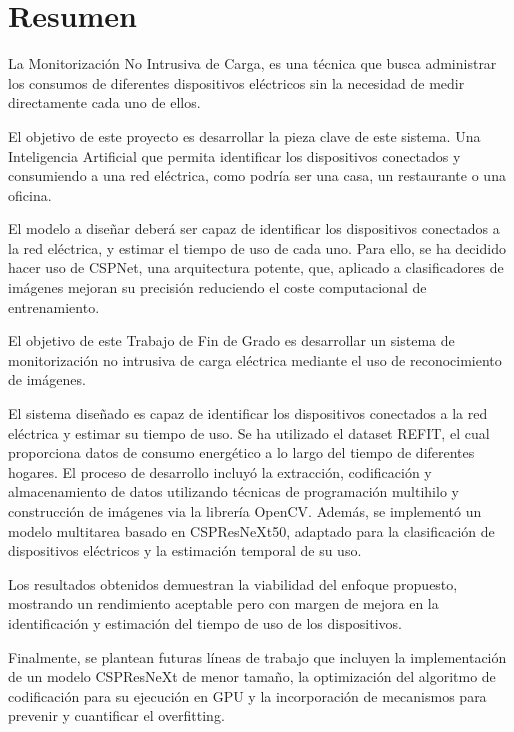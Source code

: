 \chapter*{Resumen}

La Monitorización No Intrusiva de Carga, es una técnica que busca administrar los consumos de diferentes dispositivos eléctricos sin la necesidad de medir directamente cada uno de ellos.

El objetivo de este proyecto es desarrollar la pieza clave de este sistema. Una Inteligencia Artificial que permita identificar los dispositivos conectados y consumiendo a una red eléctrica, como podría ser una casa, un restaurante o una oficina.

El modelo a diseñar deberá ser capaz de identificar los dispositivos conectados a la red eléctrica, y estimar el tiempo de uso de cada uno. Para ello, se ha decidido hacer uso de CSPNet, una arquitectura potente, que, aplicado a clasificadores de imágenes mejoran su precisión reduciendo el coste computacional de entrenamiento. 

El objetivo de este Trabajo de Fin de Grado es desarrollar un sistema de monitorización no intrusiva de carga eléctrica mediante el uso de reconocimiento de imágenes.

El sistema diseñado es capaz de identificar los dispositivos conectados a la red eléctrica y estimar su tiempo de uso. Se ha utilizado el dataset REFIT, el cual proporciona datos de consumo energético a lo largo del tiempo de diferentes hogares. El proceso de desarrollo incluyó la extracción, codificación y almacenamiento de datos utilizando técnicas de programación multihilo y construcción de imágenes via la librería OpenCV. Además, se implementó un modelo multitarea basado en CSPResNeXt50, adaptado para la clasificación de dispositivos eléctricos y la estimación temporal de su uso.

Los resultados obtenidos demuestran la viabilidad del enfoque propuesto, mostrando un rendimiento aceptable pero con margen de mejora en la identificación y estimación del tiempo de uso de los dispositivos.

Finalmente, se plantean futuras líneas de trabajo que incluyen la implementación de un modelo CSPResNeXt de menor tamaño, la optimización del algoritmo de codificación para su ejecución en GPU y la incorporación de mecanismos para prevenir y cuantificar el overfitting.

